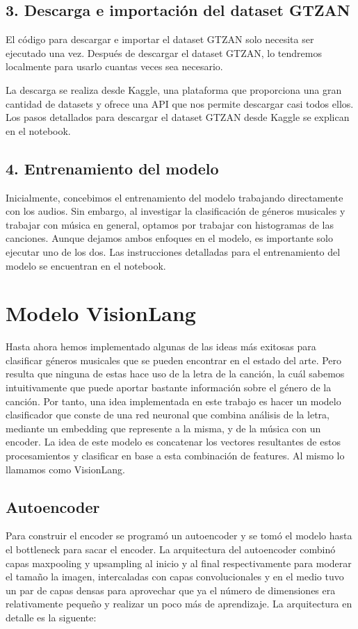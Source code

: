 \documentclass[colorinlistoftodos,twoside,twocolumn,10pt]{article} %
\begin{document}
\subsection*{3. Descarga e importación del dataset GTZAN}

El código para descargar e importar el dataset GTZAN solo necesita ser ejecutado una vez. Después de descargar el dataset GTZAN, lo tendremos localmente para usarlo cuantas veces sea necesario.

La descarga se realiza desde Kaggle, una plataforma que proporciona una gran cantidad de datasets y ofrece una API que nos permite descargar casi todos ellos. Los pasos detallados para descargar el dataset GTZAN desde Kaggle se explican en el notebook.

\subsection*{4. Entrenamiento del modelo}

Inicialmente, concebimos el entrenamiento del modelo trabajando directamente con los audios. Sin embargo, al investigar la clasificación de géneros musicales y trabajar con música en general, optamos por trabajar con histogramas de las canciones. Aunque dejamos ambos enfoques en el modelo, es importante solo ejecutar uno de los dos. Las instrucciones detalladas para el entrenamiento del modelo se encuentran en el notebook.

\section{Modelo VisionLang}

Hasta ahora hemos implementado algunas de las ideas m\'as exitosas para clasificar g\'eneros musicales que se pueden encontrar en el estado del arte. Pero resulta que ninguna de estas hace uso de la letra de la canci\'on, la cu\'al sabemos intuitivamente que puede aportar bastante informaci\'on sobre el g\'enero de la canci\'on. Por tanto, una idea implementada en este trabajo es hacer un modelo clasificador que conste de una red neuronal que combina análisis de la letra, mediante un embedding que represente a la misma, y de la música con un encoder. La idea de este modelo es concatenar los vectores resultantes de estos procesamientos y clasificar en base a esta combinación de features. Al mismo lo llamamos como VisionLang.

\subsection{Autoencoder}
Para construir el encoder se programó un autoencoder y se tomó el modelo hasta el bottleneck para sacar el encoder. La arquitectura del autoencoder combinó capas maxpooling y upsampling al inicio y al final respectivamente para moderar el tamaño la imagen, intercaladas con capas convolucionales y en el medio tuvo un par de capas densas para aprovechar que ya el número de dimensiones era relativamente pequeño y realizar un poco más de aprendizaje. La arquitectura en detalle es la siguente:
\end{document}
